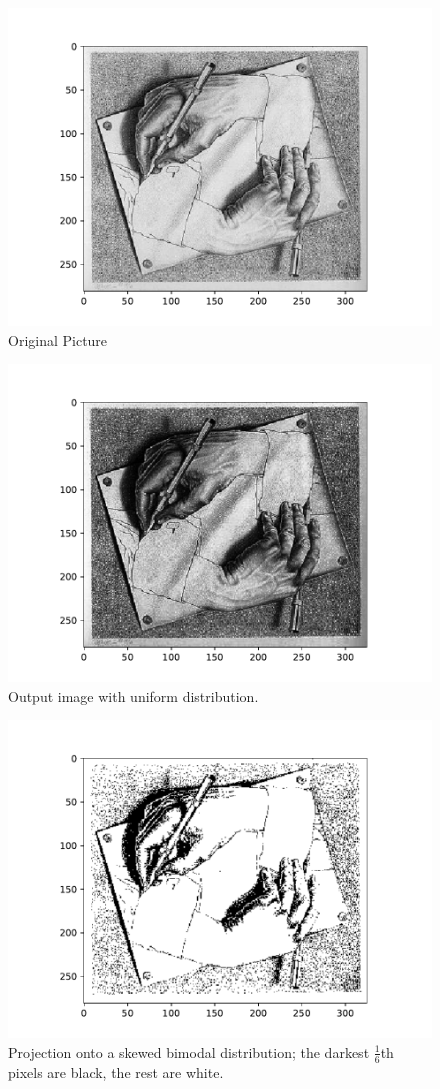 \documentclass[psamsfonts]{amsart}
\theoremstyle{definition}
\theoremstyle{remark}
\numberwithin{equation}{section}
\begin{document}
\begin{figure}
\centering
\includegraphics[width=\textwidth]{../images/original.pdf}
\caption{Original Picture}
\label{fig3}
\end{figure}

\begin{figure}
\centering
\includegraphics[width=\textwidth]{../images/rescaled.pdf}
\caption{Output image with uniform distribution.}
\label{fig4}
\end{figure}

\begin{figure}
\centering
\includegraphics[width=\textwidth]{../images/bimodal.pdf}
\caption{Projection onto a skewed bimodal distribution; 
the darkest $\frac{1}{6}$th pixels are black, the rest are white.}
\label{fig4}
\end{figure}
\end{document}
